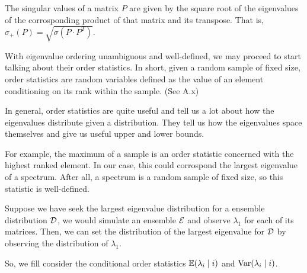 \begin{definition}
The singular values of a matrix $P$ are given by the square root of the eigenvalues of the corrosponding product of that matrix and its transpose. That is, $\sigma_+(P) = \sqrt{\sigma(P \cdot P^T)}$.
\end{definition}


\spectrumschemetable



With eigenvalue ordering unambiguous and well-defined, we may proceed to start talking about their order statistics. In short, given a random sample of fixed size, order statistics are random variables defined as the value of an element conditioning on its rank within the sample. (See A.x)

In general, order statistics are quite useful and tell us a lot about how the eigenvalues distribute given a distribution. They tell us how the eigenvalues space themselves and give us useful upper and lower bounds.

For example, the maximum of a sample is an order statistic concerned with the highest ranked element. In our case, this could corrospond the largest eigenvalue of a spectrum. After all, a spectrum is a random sample of fixed size, so this statistic is well-defined.

\begin{example}
Suppose we have seek the largest eigenvalue distribution for a ensemble distribution $\mathcal{D}$, we would simulate an ensemble $\mathcal{E}$ and observe $\lambda_1$ for each of its matrices. Then, we can set the distribution of the largest eigenvalue for $\mathcal{D}$ by observing the distribution of $\lambda_1$.
\end{example}

So, we fill consider the conditional order statistics $\mathbb{E}(\lambda_{i} \mid i)$ and $\text{Var}(\lambda_{i} \mid i)$.

\newpage
